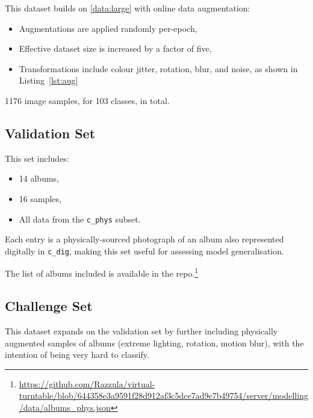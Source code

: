 \begin{uomappendix}
                This dataset builds on \ref{data:large} with online data augmentation:
                \begin{itemize}
                    \item Augmentations are applied randomly per-epoch,
                    \item Effective dataset size is increased by a factor of five,
                    \item Transformations include colour jitter, rotation, blur, and noise, as shown in Listing~\ref{lst:aug}
                \end{itemize}
    
                1176 image samples, for 103 classes, in total.
    
                
    
            \subsection{Validation Set} \label{data:val}
    
                This set includes:
                \begin{itemize}
                    \item 14 albums,
                    \item 16 samples,
                    \item All data from the \texttt{c\_phys} subset.
                \end{itemize}
    
                Each entry is a physically-sourced photograph of an album also represented digitally in \texttt{c\_dig}, making this set useful for assessing model generalisation.
                
                The list of albums included is available in the repo.\footnote{\url{https://github.com/Razzula/virtual-turntable/blob/644358e3a9591f28d912af3c5dce7ad9e7b49754/server/modelling/data/albums_phys.json}}
    
            \subsection{Challenge Set} \label{data:test}
    
                This dataset expands on the validation set by further including physically augmented samples of albums (extreme lighting, rotation, motion blur), with the intention of being very hard to classify.
    

\end{uomappendix}
